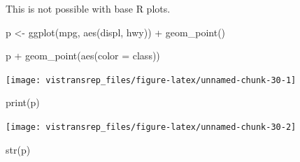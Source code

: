 \documentclass[]{book}
\newenvironment{Shaded}{}{}
\newcommand{\DataTypeTok}[1]{#1}
\newcommand{\KeywordTok}[1]{\textcolor[rgb]{0.00,0.00,1.00}{#1}}
\newcommand{\NormalTok}[1]{#1}
\newcommand{\OperatorTok}[1]{#1}
\newcommand{\StringTok}[1]{\textcolor[rgb]{0.00,0.50,0.50}{#1}}
\begin{document}
This is not possible with base R plots.

\begin{Shaded}
\begin{Highlighting}[]
\NormalTok{p <-}\StringTok{ }\KeywordTok{ggplot}\NormalTok{(mpg, }\KeywordTok{aes}\NormalTok{(displ, hwy)) }\OperatorTok{+}
\StringTok{  }\KeywordTok{geom_point}\NormalTok{()}

\NormalTok{p }\OperatorTok{+}\StringTok{ }\KeywordTok{geom_point}\NormalTok{(}\KeywordTok{aes}\NormalTok{(}\DataTypeTok{color =}\NormalTok{ class))}
\end{Highlighting}
\end{Shaded}

\begin{flushright}\texttt{[image: vistransrep\_files/figure-latex/unnamed-chunk-30-1]} \end{flushright}

\begin{Shaded}
\begin{Highlighting}[]
\KeywordTok{print}\NormalTok{(p)}
\end{Highlighting}
\end{Shaded}

\begin{flushright}\texttt{[image: vistransrep\_files/figure-latex/unnamed-chunk-30-2]} \end{flushright}

\begin{Shaded}
\begin{Highlighting}[]
\KeywordTok{str}\NormalTok{(p)}
\end{Highlighting}
\end{Shaded}
\end{document}
